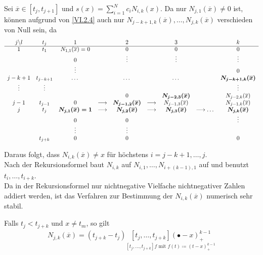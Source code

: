\label{6.2.8}
Sei $\overline{x}\in[t_j,t_{j+1}]$ und
$s(x) = \sum_{i=1}^{N}c_iN_{i,k}(x)$.
Da nur $N_{j,1}(\overline{x})\neq 0$ ist, 
können aufgrund von \eqref{VI.2.4}
auch nur $N_{j-k+1, k}(\overline{x}), \dots, N_{j,k}(\overline{x})$
verschieden von Null sein, da
\begin{align*}
  \begin{array}{ccccccccc}
    j\backslash l & t_j & 1 && 2 && 3 &&k\\
    \cline{1-9}
    1 & t_1 & N_{1,1}(\overline{x})=0 &&0&&0&&0\\
                  &&0&&\vdots&&\vdots&&\vdots\\
                  &&\vdots &&&&&&0\\
    j-k+1&t_{j-k+1} &\dots &&\dots&&\dots&&\boldsymbol{N_{j-k+1,k}(\overline{x})} \\
    \vdots&\vdots&&&&&&&\vdots\\
                  && &&0&& \boldsymbol{N_{j-2,3}(\overline{x})}
                                 &&N_{j-2,k}(\overline{x})\\
    j-1 & t_{j-1} &0 &\longrightarrow & \boldsymbol{N_{j-1,2}(\overline{x})}
                                      &\longrightarrow & N_{j-1,3}(\overline{x})
            && N_{j-1,k}(\overline{x})\\
    j& t_j & \boldsymbol{N_{j,1}(\overline{x})=1}&\longrightarrow&\boldsymbol{N_{j,2}(\overline{x})}
                                      &\longrightarrow&\boldsymbol{N_{j,3}(\overline{x})}&\longrightarrow\dots&\boldsymbol{N_{j,k}(\overline{x})}\\
                  &&0&&0&&&&\vdots\\
                  &&\vdots &&\vdots\\
                  &t_{j+k}&0&&0&&&&0
  \end{array}
\end{align*}

Daraus folgt, dass $N_{i,k}(\overline{x})\neq x$ 
für höchstens $i=j-k+1,\dots, j$.\\
Nach der Rekursionsformel baut $N_{i,k}$ auf 
$N_{i,1},\dots , N_{i+(k-1),1}$ auf und
benutzt $t_i,\dots, t_{i+k}$.\\
Da in der Rekursionsformel nur nichtnegative Vielfache
nichtnegativer Zahlen addiert werden,
ist das Verfahren zur Bestimmung der $N_{i,k}(\overline{x})$
numerisch sehr stabil.

\begin{Leme}
  Falls $t_j<t_{j+k}$ und $x\neq t_m$,
  so gilt
  \begin{gather}
    N_{j,k}(\overline{x})=(t_{j+k}-t_j)\underset{
      [t_j,\dots, t_{j+k}]f\text{ mit } f(t)\coloneqq (t-x)_+^{k-1}}
    {[t_j,\dots,t_{j+k}](\bullet -x)_+^{k-1}}
    \label{VI.2.5}
  \end{gather}
\end{Leme}

